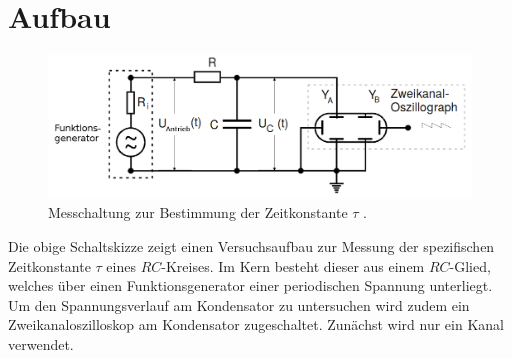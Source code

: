\section{Aufbau}
\label{sec:Aufbau}


\begin{figure}[H]
 \centering
 \includegraphics[width=\linewidth-100pt,height=\textheight-100pt,keepaspectratio]{content/aufbau353.png}
 \caption{Messchaltung zur Bestimmung der Zeitkonstante $\tau$ \cite{V353}.}
 \label{fig:Aufbaua}
\end{figure}
Die obige Schaltskizze zeigt einen Versuchsaufbau zur Messung der spezifischen
 Zeitkonstante $\tau$ eines $RC$-Kreises. Im Kern besteht dieser aus einem $RC$-Glied, welches über einen
  Funktionsgenerator einer periodischen Spannung unterliegt. Um den
   Spannungsverlauf am Kondensator zu untersuchen wird zudem ein
    Zweikanaloszilloskop am Kondensator zugeschaltet. Zunächst wird nur ein Kanal verwendet.
